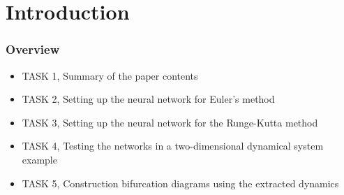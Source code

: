 \section{Introduction}

\begin{frame}
	\frametitle{Overview}
	\begin{itemize}
		\item TASK 1, Summary of the paper contents
		\item TASK 2, Setting up the neural network for Euler's method
		\item TASK 3, Setting up the neural network for the Runge-Kutta method
		\item TASK 4, Testing the networks in a two-dimensional dynamical system example
		\item TASK 5, Construction bifurcation diagrams using the extracted dynamics
	\end{itemize}
\end{frame}
